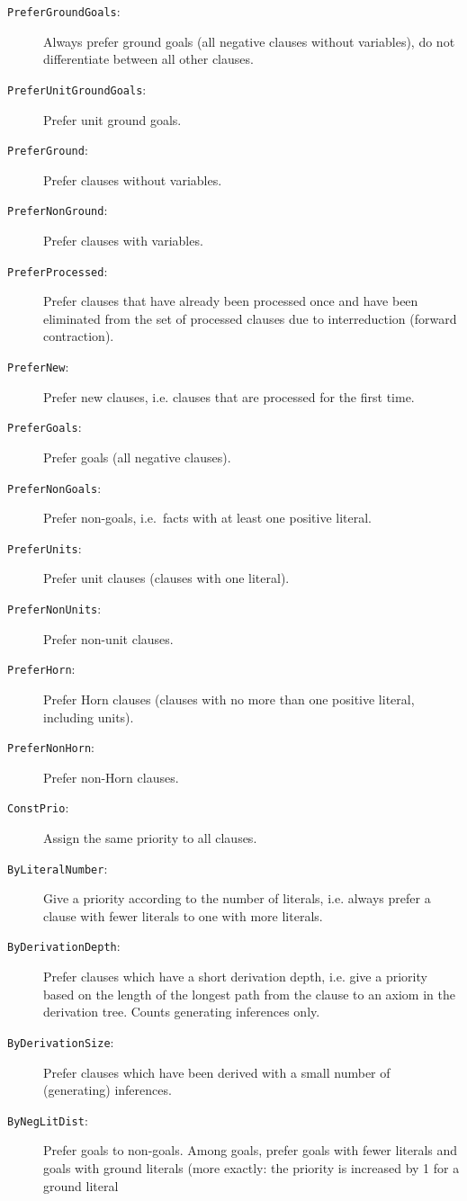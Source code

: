 \documentclass{report}
\begin{document}
\begin{description}
\item[\texttt{PreferGroundGoals}:] Always prefer ground goals (all
  negative clauses without variables), do not differentiate between
  all other clauses.
\item[\texttt{PreferUnitGroundGoals}:] Prefer unit ground goals.
\item[\texttt{PreferGround}:] Prefer clauses without variables.
\item[\texttt{PreferNonGround}:] Prefer clauses with variables.
\item[\texttt{PreferProcessed}:] Prefer clauses that have already been
  processed once and have been eliminated from the set of processed
  clauses due to interreduction (forward contraction).
\item[\texttt{PreferNew}:] Prefer new clauses, i.e. clauses that are
  processed for the first time.
\item[\texttt{PreferGoals}:] Prefer goals (all negative clauses).
\item[\texttt{PreferNonGoals}:] Prefer non-goals, i.e.\ facts with at
  least one positive literal.
\item[\texttt{PreferUnits}:] Prefer unit clauses (clauses with one
  literal).
\item[\texttt{PreferNonUnits}:] Prefer non-unit clauses.
\item[\texttt{PreferHorn}:] Prefer Horn clauses (clauses with no more
  than one positive literal, including units).
\item[\texttt{PreferNonHorn}:] Prefer non-Horn clauses.
\item[\texttt{ConstPrio}:] Assign the same priority to all clauses.
\item[\texttt{ByLiteralNumber}:] Give a priority according to the
  number of literals, i.e. always prefer a clause with fewer literals
  to one with more literals.
\item[\texttt{ByDerivationDepth}:] Prefer clauses which have a short
  derivation depth, i.e. give a priority based on the length of the
  longest path from the clause to an axiom in the derivation
  tree. Counts generating inferences only.
\item[\texttt{ByDerivationSize}:] Prefer clauses which have been
  derived with a small number of (generating) inferences.
\item[\texttt{ByNegLitDist}:] Prefer goals to non-goals. Among goals,
  prefer goals with fewer literals and goals with ground literals
  (more exactly: the priority is increased by 1 for a ground literal

\end{description}
\end{document}
